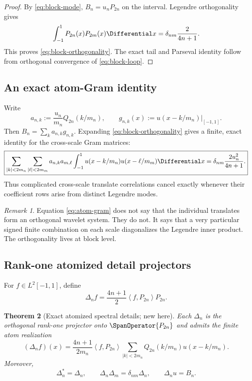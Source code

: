 \documentclass[11pt,oneside]{article}
\numberwithin{equation}{section}
\newtheorem{theorem}{Theorem}[section]
\theoremstyle{definition}
\theoremstyle{remark}
\newtheorem{remark}[theorem]{Remark}
\newcommand{\inner}[2]{\left\langle#1,#2\right\rangle}
\begin{document}
\begin{proof}
By \eqref{eq:block-mode}, $B_n=u_nP_{2n}$ on the interval.  Legendre
orthogonality gives
\[
 \int_{-1}^{1}P_{2n}(x)P_{2m}(x)\Differential x
 =\delta_{nm}\frac{2}{4n+1}.
\]
This proves \eqref{eq:block-orthogonality}.  The exact tail and Parseval
identity follow from orthogonal convergence of \eqref{eq:block-loop}.
\end{proof}

\subsection{An exact atom-Gram identity}

Write
\begin{equation}
 a_{n,k}:=\frac{u_n}{m_n}Q_{2n}(k/m_n),
 \qquad
 g_{n,k}(x):=u(x-k/m_n)\big|_{[-1,1]}.
 \label{eq:atom-data}
\end{equation}
Then $B_n=\sum_ka_{n,k}g_{n,k}$.  Expanding
\eqref{eq:block-orthogonality} gives a finite, exact identity for the
cross-scale Gram matrices:
\begin{equation}
 \boxed{
 \sum_{|k|<2m_n}\sum_{|\ell|<2m_m}
 a_{n,k}a_{m,\ell}
 \int_{-1}^{1}u(x-k/m_n)u(x-\ell/m_m)\Differential x
 =\delta_{nm}\frac{2u_n^2}{4n+1}.}
 \label{eq:atom-gram}
\end{equation}
Thus complicated cross-scale translate correlations cancel exactly whenever
their coefficient rows arise from distinct Legendre modes.

\begin{remark}
Equation \eqref{eq:atom-gram} does not say that the individual translates form
an orthogonal wavelet system.  They do not.  It says that a very particular
signed finite combination on each scale diagonalizes the Legendre inner
product.  The orthogonality lives at block level.
\end{remark}

\subsection{Rank-one atomized detail projectors}

For $f\in L^2[-1,1]$, define
\begin{equation}
 \Delta_nf=\frac{4n+1}{2}\inner{f}{P_{2n}}P_{2n}.
 \label{eq:detail-projector}
\end{equation}

\begin{theorem}[Exact atomized spectral details; new here]
\label{thm:detail-atomization}
Each $\Delta_n$ is the orthogonal rank-one projector onto
$\SpanOperator\{P_{2n}\}$ and admits the finite atom realization
\begin{equation}
 \boxed{
 (\Delta_nf)(x)=\frac{4n+1}{2m_n}\inner{f}{P_{2n}}
 \sum_{|k|<2m_n}Q_{2n}(k/m_n)u(x-k/m_n).}
 \label{eq:detail-atomization}
\end{equation}
Moreover,
\begin{equation}
 \Delta_n^*=\Delta_n,
 \qquad
 \Delta_n\Delta_m=\delta_{nm}\Delta_n,
 \qquad
 \Delta_nu=B_n.
 \label{eq:detail-algebra}
\end{equation}
\end{theorem}
\end{document}
